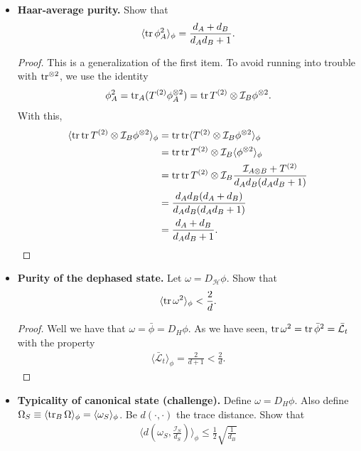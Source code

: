 \documentclass{book}
\theoremstyle{definition}
\newcommand{\lag}{\mathcal{L}}
\newcommand{\nn}{\nonumber}
\newcommand{\had}{\mathcal{H}}
\newcommand{\f}[2]{\frac{#1}{#2}}
\newcommand{\lp}{\left(}
\newcommand{\rp}{\right)}
\newcommand{\la}{\langle}
\newcommand{\ra}{\rangle}
\newcommand{\Id}{\mathcal{I}}
\begin{document}
\begin{itemize}
	
	\begin{proof}
		to be continued...
	\end{proof}
	
	\item \textbf{Haar-average purity.} Show that
	\begin{align}
	\langle \tr \phi_A^2 \rangle_\phi = \f{d_A + d_B}{d_A d_B + 1}.
	\end{align}
	
	
	\begin{proof}
		This is a generalization of the first item. To avoid running into trouble with $\tr^{\otimes 2}$, we use the identity
		\begin{align}
		\phi_A^2 = \tr_A (T^{(2)} \phi_A^{\otimes 2}) =  \tr   T^{(2)} \otimes \Id_B  \phi^{\otimes 2}.
		\end{align}
		With this, 
		\begin{align}
		\la \tr \tr T^{(2)} \otimes \Id_B  \phi^{\otimes 2}  \ra_\phi &= \tr \tr \la T^{(2)} \otimes \Id_B \phi^{\otimes 2} \ra_\phi \nn\\
		&= \tr \tr  T^{(2)} \otimes \Id_B \la \phi^{\otimes 2} \ra_\phi \nn\\
		&= \tr \tr T^{(2)} \otimes \Id_B \f{\Id_{A\otimes B} + T^{(2)}}{d_A d_B(d_A d_B + 1)} \nn\\
		&= \f{d_A d_B(d_A + d_B)}{d_Ad_B(d_A d_B  + 1)}\nn\\
		&= \f{d_A + d_B}{d_A d_B + 1}.
		\end{align}
	\end{proof}


	\item \textbf{Purity of the dephased state.} Let $\omega = D_\had \phi$. Show that 
	\begin{align}
	\la \tr \omega^2 \ra_\phi < \f{2}{d}.
	\end{align}
	
	\begin{proof}
		Well we have that $\omega = \bar{\phi} = D_H \phi$. As we have seen, $\tr \omega^2 = \tr \bar{\phi}^2 = \bar{\lag}_t$ with the property
		\begin{align}
		\la \bar{\lag}_t \ra_\phi = \f{2}{d+1} < \f{2}{d}. 
		\end{align}
	\end{proof}




	\item \textbf{Typicality of canonical state (challenge).} Define $\omega = D_H \phi$. Also define $\Omega_S \equiv \la \tr_B \Omega \ra_\phi = \la \omega_S\ra_\phi$. Be $d(\cdot,\cdot)$ the trace distance. Show that
	\begin{align}
	\langle d\lp \omega_S, \f{\Id_S}{d_S} \rp \rangle_\phi \leq \f{1}{2}\sqrt{\f{1}{d_B}}
	\end{align}
	

\end{itemize}
\end{document}
